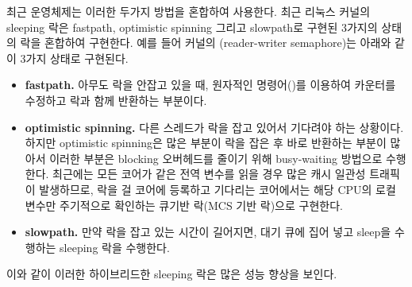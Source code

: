 최근 운영체제는 이러한 두가지 방법을 혼합하여 사용한다. 
최근 리눅스 커널의 sleeping 락은 fastpath, optimistic spinning 그리고 slowpath로 구현된 3가지의 상태의
락을 혼합하여 구현한다.
예를 들어 커널의 (reader-writer semaphore)는 아래와 같이 3가지 상태로 구현된다.
\begin{itemize}
\item \textbf{fastpath.} 아무도 락을 안잡고 있을 때, 원자적인 명령어()를 이용하여
카운터를 수정하고 락과 함께 반환하는 부분이다.
\item \textbf{optimistic spinning.} 다른 스레드가 락을 잡고 있어서 기다려야 하는 상황이다.
하지만 optimistic spinning은 많은 부분이 락을 잡은 후 바로 반환하는 부분이 많아서 이러한 부분은 blocking 오버헤드를
줄이기 위해 busy-waiting 방법으로 수행한다. 최근에는 모든 코어가 같은 전역 변수를 읽을 경우 많은 
캐시 일관성 트래픽이 발생하므로, 락을 걸 코어에 등록하고 기다리는 코어에서는 해당 CPU의 로컬 변수만 
주기적으로 확인하는 큐기반 락(MCS 기반 락)으로 구현한다. 
\item \textbf{slowpath.} 만약 락을 잡고 있는 시간이 길어지면, 대기 큐에 집어 넣고 sleep을 수행하는 sleeping
락을 수행한다. 
\end{itemize}
이와 같이 이러한 하이브리드한 sleeping 락은 많은 성능 향상을 보인다. 





